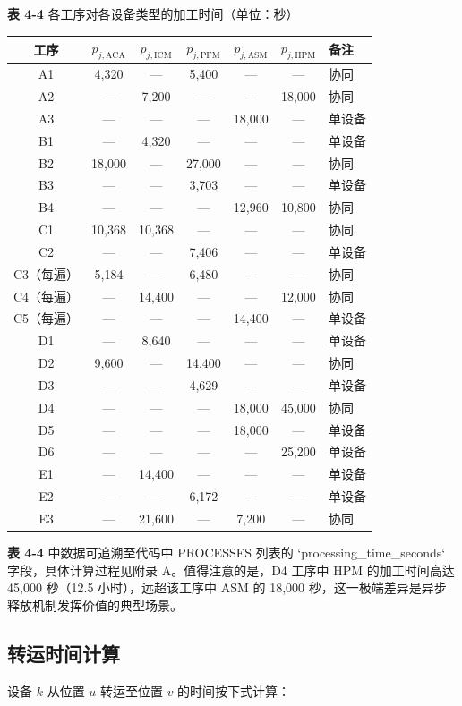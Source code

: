 \documentclass[UTF8,a4paper,12pt]{ctexart}
\begin{document}
\begin{center}
\textbf{表 4-4} 各工序对各设备类型的加工时间（单位：秒）
\begin{tabular}{cccccc l}
\toprule
工序 & $p_{j,\text{ACA}}$ & $p_{j,\text{ICM}}$ & $p_{j,\text{PFM}}$ & $p_{j,\text{ASM}}$ & $p_{j,\text{HPM}}$ & 备注 \\
\midrule
A1 & 4,320 & — & 5,400 & — & — & 协同 \\
A2 & — & 7,200 & — & — & 18,000 & 协同 \\
A3 & — & — & — & 18,000 & — & 单设备 \\
B1 & — & 4,320 & — & — & — & 单设备 \\
B2 & 18,000 & — & 27,000 & — & — & 协同 \\
B3 & — & — & 3,703 & — & — & 单设备 \\
B4 & — & — & — & 12,960 & 10,800 & 协同 \\
C1 & 10,368 & 10,368 & — & — & — & 协同 \\
C2 & — & — & 7,406 & — & — & 单设备 \\
C3（每遍） & 5,184 & — & 6,480 & — & — & 协同 \\
C4（每遍） & — & 14,400 & — & — & 12,000 & 协同 \\
C5（每遍） & — & — & — & 14,400 & — & 单设备 \\
D1 & — & 8,640 & — & — & — & 单设备 \\
D2 & 9,600 & — & 14,400 & — & — & 协同 \\
D3 & — & — & 4,629 & — & — & 单设备 \\
D4 & — & — & — & 18,000 & 45,000 & 协同 \\
D5 & — & — & — & 18,000 & — & 单设备 \\
D6 & — & — & — & — & 25,200 & 单设备 \\
E1 & — & 14,400 & — & — & — & 单设备 \\
E2 & — & — & 6,172 & — & — & 单设备 \\
E3 & — & 21,600 & — & 7,200 & — & 协同 \\
\bottomrule
\end{tabular}
\end{center}

\textbf{表 4-4} 中数据可追溯至代码中 PROCESSES 列表的 `processing_time_seconds` 字段，具体计算过程见附录 A。值得注意的是，D4 工序中 HPM 的加工时间高达 45,000 秒（12.5 小时），远超该工序中 ASM 的 18,000 秒，这一极端差异是异步释放机制发挥价值的典型场景。

\subsection{转运时间计算}
设备 $k$ 从位置 $u$ 转运至位置 $v$ 的时间按下式计算：
\end{document}
